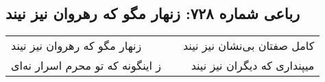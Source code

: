 \begin{center}
\section*{رباعی شماره ۷۲۸: زنهار مگو که رهروان نیز نیند}
\label{sec:0728}
\begin{longtable}{l p{0.5cm} r}
زنهار مگو که رهروان نیز نیند
&&
کامل صفتان بی‌نشان نیز نیند
\\
ز اینگونه که تو محرم اسرار نه‌ای
&&
میپنداری که دیگران نیز نیند
\\
\end{longtable}
\end{center}
